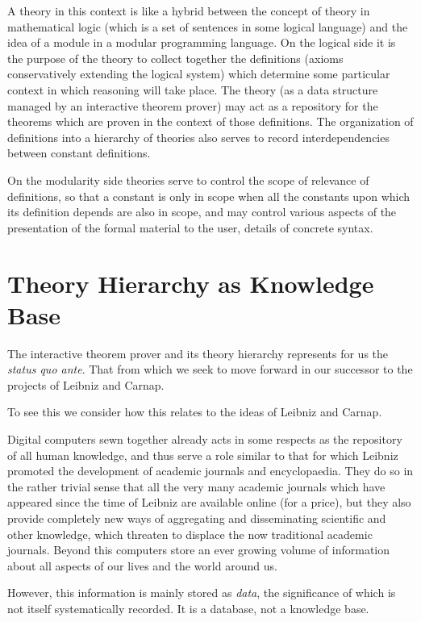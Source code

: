 A theory in this context is like a hybrid between the concept of
theory in mathematical logic (which is a set of sentences in some
logical language) and the idea of a module in a modular programming
language.
On the logical side it is the purpose of the theory to collect
together the definitions (axioms conservatively extending the
logical system) which determine some particular context in which
reasoning will take place.
The theory (as a data structure managed by an interactive theorem
prover) may act as a repository for the theorems which are proven in
the context of those definitions.
The organization of definitions into a hierarchy of theories also
serves to record interdependencies between constant definitions.

On the modularity side theories serve to control the scope of
relevance of definitions, so that a constant is only in scope when all
the constants upon which its definition depends are also in scope, and
may control various aspects of the presentation of the formal material
to the user, details of concrete syntax.

\section{Theory Hierarchy as Knowledge Base}

The interactive theorem prover and its theory hierarchy represents for
us the \emph{status quo ante}.
That from which we seek to move forward in our successor to the
projects of Leibniz and Carnap.

To see this we consider how this relates to the ideas of Leibniz and
Carnap.

Digital computers sewn together already acts in some respects as the
repository of all human knowledge, and thus serve a role similar to
that for which Leibniz promoted the development of academic journals
and encyclopaedia.
They do so in the rather trivial sense that all the very many academic
journals which have appeared since the time of Leibniz are available
online (for a price), but they also provide completely new ways of
aggregating and disseminating scientific and other knowledge, which
threaten to displace the now traditional academic journals.
Beyond this computers store an ever growing volume of information
about all aspects of our lives and the world around us.

However, this information is mainly stored as \emph{data}, the
significance of which is not itself systematically recorded.
It is a database, not a knowledge base.

